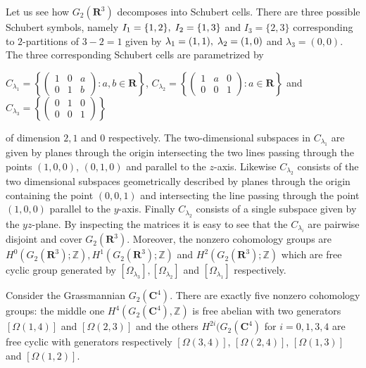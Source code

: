 \documentclass[a4paper,openany]{scrbook}
\begin{document}
\begin{example}
Let us see how $G_2(\mathbf{R}^3)$ decomposes into Schubert cells. There are three possible Schubert symbols, namely $I_1 = \{ 1,2 \}, \thickspace I_2 = \{ 1,3 \}$ and $I_3 = \{ 2,3 \}$ corresponding to $2$-partitions of $3-2 = 1$ given by $\lambda_1 = (1,1), \thickspace \lambda_2 = (1,0)$ and $\lambda_3 = (0,0)$. 
The three corresponding Schubert cells are parametrized by
\begin{center}
$\displaystyle C_{\lambda_1} = \left \{  \begin{pmatrix} 1 & 0 & a \\ 0 & 1 & b \end{pmatrix} : a,b \in \mathbf{R} \right \}$, $\displaystyle C_{\lambda_2} = \left \{  \begin{pmatrix} 1 & a & 0 \\ 0 & 0 & 1 \end{pmatrix} : a \in \mathbf{R} \right \}$ and $\displaystyle C_{\lambda_3} = \left \{  \begin{pmatrix} 0 & 1 & 0 \\ 0 & 0 & 1 \end{pmatrix} \right \}$
\end{center} \noindent
of dimension $2,1$ and $0$ respectively. The two-dimensional subspaces in $C_{\lambda_1}$ are given by planes  through the origin intersecting the two lines passing through the points $(1,0,0)$, $(0,1,0)$ and parallel to the $z$-axis. Likewise $C_{\lambda_2}$ consists of the two dimensional subspaces geometrically described by planes through the origin containing the point $(0,0,1)$ and intersecting the line passing through the point $(1,0,0)$ parallel to the $y$-axis. Finally $C_{\lambda_2}$ consists of a single subspace given by the $yz$-plane. By inspecting the matrices it is easy to see that the $C_{\lambda_i}$ are pairwise disjoint and cover $G_2(\mathbf{R}^3)$. Moreover, the nonzero cohomology groups are $H^0(G_2(\mathbf{R}^3);\mathbb{Z}),H^1(G_2(\mathbf{R}^3);\mathbb{Z})$ and $H^2(G_2(\mathbf{R}^3);\mathbb{Z})$ which are free cyclic group generated by $\left[\Omega_{\lambda_3} \right],\left[\Omega_{\lambda_2}\right]$ and $\left[\Omega_{\lambda_1} \right]$ respectively.
\end{example}
\begin{example}
Consider the Grassmannian $G_2(\mathbf{C}^4)$. There are exactly five nonzero cohomology groups: the middle one $H^4(G_2(\mathbf{C}^4),\mathbb{Z})$ is free abelian with two generators $\left[\Omega({1,4}) \right]$ and $\left[\Omega({2,3}) \right]$ and the others $H^{2i}(G_2(\mathbf{C}^4)$ for $i=0,1,3,4$ are free cyclic with generators respectively $\left[\Omega({3,4}) \right]$,  $\left[\Omega({2,4}) \right]$,  $\left[\Omega({1,3}) \right]$ and  $\left[\Omega({1,2}) \right]$.
\end{example}
\end{document}
